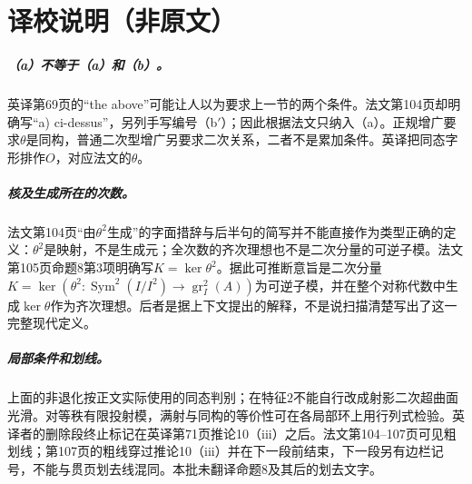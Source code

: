 \documentclass[openany,fontset=fandol]{ctexbook}
\begin{document}
\chapter*{译校说明（非原文）}
\paragraph{（a）不等于（a）和（b）。}
英译第69页的“the above”可能让人以为要求上一节的两个条件。法文第104页却明确写“a) ci-dessus”，另列手写编号（b$'$）；因此根据法文只纳入（a）。正规增广要求$\theta$是同构，普通二次型增广另要求二次关系，二者不是累加条件。英译把同态字形排作$O$，对应法文的$\theta$。

\paragraph{核及生成所在的次数。}
法文第104页“由$\theta^2$生成”的字面措辞与后半句的简写并不能直接作为类型正确的定义：$\theta^2$是映射，不是生成元；全次数的齐次理想也不是二次分量的可逆子模。法文第105页命题8第3项明确写$K=\ker\theta^2$。据此可推断意旨是二次分量$K=\ker(\theta^2:\operatorname{Sym}^2(I/I^2)\to\operatorname{gr}_I^2(A))$为可逆子模，并在整个对称代数中生成$\ker\theta$作为齐次理想。后者是据上下文提出的解释，不是说扫描清楚写出了这一完整现代定义。

\paragraph{局部条件和划线。}
上面的非退化按正文实际使用的同态判别；在特征$2$不能自行改成射影二次超曲面光滑。对等秩有限投射模，满射与同构的等价性可在各局部环上用行列式检验。英译者的删除段终止标记在英译第71页推论10（iii）之后。法文第104--107页可见粗划线；第107页的粗线穿过推论10（iii）并在下一段前结束，下一段另有边栏记号，不能与贯页划去线混同。本批未翻译命题8及其后的划去文字。
\end{document}
